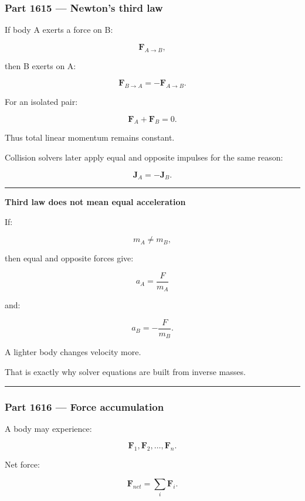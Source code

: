 \subsubsection{Part 1615 --- Newton's third law}\label{part-1615-newtons-third-law}

If body A exerts a force on B:

\[
\mathbf{F}_{A\rightarrow B},
\]

then B exerts on A:

\[
\boxed{
\mathbf{F}_{B\rightarrow A}
=
-\mathbf{F}_{A\rightarrow B}.
}
\]

For an isolated pair:

\[
\mathbf{F}_A+
\mathbf{F}_B=0.
\]

Thus total linear momentum remains constant.

Collision solvers later apply equal and opposite impulses for the same reason:

\[
\mathbf{J}_A=-\mathbf{J}_B.
\]

\begin{center}\rule{0.5\linewidth}{0.5pt}\end{center}

\textbf{Third law does not mean equal acceleration}

If:

\[
m_A\neq m_B,
\]

then equal and opposite forces give:

\[
a_A=\frac{F}{m_A}
\]

and:

\[
a_B=-\frac{F}{m_B}.
\]

A lighter body changes velocity more.

That is exactly why solver equations are built from inverse masses.

\begin{center}\rule{0.5\linewidth}{0.5pt}\end{center}

\subsubsection{Part 1616 --- Force accumulation}\label{part-1616-force-accumulation}

A body may experience:

\[
\mathbf{F}_1,
\mathbf{F}_2,\dots,\mathbf{F}_n.
\]

Net force:

\[
\boxed{
\mathbf{F}_{net}
=
\sum_i
\mathbf{F}_i.
}
\]


